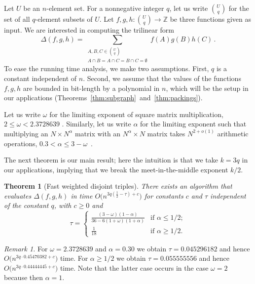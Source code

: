 \documentclass{amsart}
\newtheorem{Thm}{Theorem}
\begin{document}
Let $U$ be an $n$-element set. For a nonnegative integer $q$, let us write $\binom{U}{q}$ for the set of all $q$-element subsets of $U$. 
Let $f,g,h:\binom{U}{q}\rightarrow \mathbb{Z}$ be three functions given 
as input. We are interested in computing the trilinear form
\begin{equation}
\label{eq:main}
\Delta(f,g,h)=\!\!\!\!\!\!\!\!\!\sum_{\substack{A,B,C\in\binom{U}{q}\\A\cap B=A\cap C=B\cap C=\emptyset}}\!\!\!\!\!\!\!\!\!
f(A)g(B)h(C)\,.
\end{equation}
To ease the running time analysis, we make two assumptions. 
First, $q$ is a constant independent of $n$. 
Second, we assume that the values of the functions $f,g,h$ are 
bounded in bit-length by a polynomial in $n$, which will be the setup 
in our applications (Theorems~\ref{thm:subgraph}~and~\ref{thm:packings}).

Let us write $\omega$ for the limiting exponent of square matrix 
multiplication, $2\leq \omega<2.3728639$ \cite{LG14,VW12}.
Similarly, let us write $\alpha$ for the limiting 
exponent such that multiplying an $N\times N^\alpha$ matrix with 
an $N^\alpha\times N$ matrix takes $N^{2+o(1)}$ arithmetic operations, 
$0.3<\alpha\leq 3-\omega$~\cite{LG12}. 

The next theorem is our main result; here the intuition is that we
take $k=3q$ in our applications, implying that we break the 
meet-in-the-middle exponent $k/2$.

\begin{Thm}[Fast weighted disjoint triples]
\label{thm:main}
There exists an algorithm that evaluates $\Delta(f,g,h)$ 
in time $O\bigl(n^{3q(\frac{1}{2}-\tau)+c}\bigl)$
for constants $c$ and $\tau$ independent of the constant $q$,
with $c\geq 0$ and 
\begin{equation}
\label{eq:tau}
\tau=
\begin{cases}
\frac{(3-\omega)(1-\alpha)}{36-6(1+\omega)(1+\alpha)} & \text{if $\alpha\leq 1/2$};\\
\frac{1}{18} & \text{if $\alpha\geq 1/2$.}
\end{cases}
\end{equation}
\end{Thm}

\noindent
{\em Remark 1.} 
For $\omega=2.3728639$ and $\alpha=0.30$ we obtain $\tau=0.045296182$ and hence
$O\bigl(n^{3q\cdot 0.45470382+c}\bigr)$ time.
For $\alpha\geq 1/2$ we obtain $\tau=0.055555556$ and hence
$O\bigl(n^{3q\cdot 0.44444445+c}\bigr)$ time. Note that the latter case
occurs in the case $\omega=2$ because then $\alpha=1$.
\end{document}
